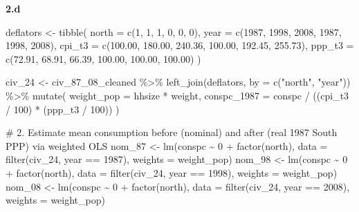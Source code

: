 \documentclass[
  letterpaper,
  DIV=11,
  numbers=noendperiod]{scrartcl}
\newenvironment{Shaded}{\begin{snugshade}}{\end{snugshade}}
\newcommand{\AttributeTok}[1]{\textcolor[rgb]{0.40,0.45,0.13}{#1}}
\newcommand{\CommentTok}[1]{\textcolor[rgb]{0.37,0.37,0.37}{#1}}
\newcommand{\DecValTok}[1]{\textcolor[rgb]{0.68,0.00,0.00}{#1}}
\newcommand{\FloatTok}[1]{\textcolor[rgb]{0.68,0.00,0.00}{#1}}
\newcommand{\FunctionTok}[1]{\textcolor[rgb]{0.28,0.35,0.67}{#1}}
\newcommand{\NormalTok}[1]{\textcolor[rgb]{0.00,0.23,0.31}{#1}}
\newcommand{\OtherTok}[1]{\textcolor[rgb]{0.00,0.23,0.31}{#1}}
\newcommand{\SpecialCharTok}[1]{\textcolor[rgb]{0.37,0.37,0.37}{#1}}
\newcommand{\StringTok}[1]{\textcolor[rgb]{0.13,0.47,0.30}{#1}}
\begin{document}
\textbf{2.d}

\begin{Shaded}
\begin{Highlighting}[]
\NormalTok{deflators }\OtherTok{\textless{}{-}} \FunctionTok{tibble}\NormalTok{(}
  \AttributeTok{north =} \FunctionTok{c}\NormalTok{(}\DecValTok{1}\NormalTok{, }\DecValTok{1}\NormalTok{, }\DecValTok{1}\NormalTok{, }\DecValTok{0}\NormalTok{, }\DecValTok{0}\NormalTok{, }\DecValTok{0}\NormalTok{),}
  \AttributeTok{year  =} \FunctionTok{c}\NormalTok{(}\DecValTok{1987}\NormalTok{, }\DecValTok{1998}\NormalTok{, }\DecValTok{2008}\NormalTok{, }\DecValTok{1987}\NormalTok{, }\DecValTok{1998}\NormalTok{, }\DecValTok{2008}\NormalTok{),}
  \AttributeTok{cpi\_t3 =} \FunctionTok{c}\NormalTok{(}\FloatTok{100.00}\NormalTok{, }\FloatTok{180.00}\NormalTok{, }\FloatTok{240.36}\NormalTok{, }\FloatTok{100.00}\NormalTok{, }\FloatTok{192.45}\NormalTok{, }\FloatTok{255.73}\NormalTok{),}
  \AttributeTok{ppp\_t3 =} \FunctionTok{c}\NormalTok{(}\FloatTok{72.91}\NormalTok{,  }\FloatTok{68.91}\NormalTok{,  }\FloatTok{66.39}\NormalTok{,  }\FloatTok{100.00}\NormalTok{, }\FloatTok{100.00}\NormalTok{, }\FloatTok{100.00}\NormalTok{)}
\NormalTok{)}

\NormalTok{civ\_24 }\OtherTok{\textless{}{-}}\NormalTok{ civ\_87\_08\_cleaned }\SpecialCharTok{\%\textgreater{}\%}
  \FunctionTok{left\_join}\NormalTok{(deflators, }\AttributeTok{by =} \FunctionTok{c}\NormalTok{(}\StringTok{"north"}\NormalTok{, }\StringTok{"year"}\NormalTok{)) }\SpecialCharTok{\%\textgreater{}\%}
  \FunctionTok{mutate}\NormalTok{(}
    \AttributeTok{weight\_pop  =}\NormalTok{ hhsize }\SpecialCharTok{*}\NormalTok{ weight,}
    \AttributeTok{conspc\_1987 =}\NormalTok{ conspc }\SpecialCharTok{/}\NormalTok{ ((cpi\_t3 }\SpecialCharTok{/} \DecValTok{100}\NormalTok{) }\SpecialCharTok{*}\NormalTok{ (ppp\_t3 }\SpecialCharTok{/} \DecValTok{100}\NormalTok{))}
\NormalTok{  )}

\CommentTok{\# 2. Estimate mean consumption before (nominal) and after (real 1987 South PPP) via weighted OLS}
\NormalTok{nom\_87  }\OtherTok{\textless{}{-}} \FunctionTok{lm}\NormalTok{(conspc }\SpecialCharTok{\textasciitilde{}} \DecValTok{0} \SpecialCharTok{+} \FunctionTok{factor}\NormalTok{(north), }\AttributeTok{data =} \FunctionTok{filter}\NormalTok{(civ\_24, year }\SpecialCharTok{==} \DecValTok{1987}\NormalTok{), }\AttributeTok{weights =}\NormalTok{ weight\_pop)}
\NormalTok{nom\_98  }\OtherTok{\textless{}{-}} \FunctionTok{lm}\NormalTok{(conspc }\SpecialCharTok{\textasciitilde{}} \DecValTok{0} \SpecialCharTok{+} \FunctionTok{factor}\NormalTok{(north), }\AttributeTok{data =} \FunctionTok{filter}\NormalTok{(civ\_24, year }\SpecialCharTok{==} \DecValTok{1998}\NormalTok{), }\AttributeTok{weights =}\NormalTok{ weight\_pop)}
\NormalTok{nom\_08  }\OtherTok{\textless{}{-}} \FunctionTok{lm}\NormalTok{(conspc }\SpecialCharTok{\textasciitilde{}} \DecValTok{0} \SpecialCharTok{+} \FunctionTok{factor}\NormalTok{(north), }\AttributeTok{data =} \FunctionTok{filter}\NormalTok{(civ\_24, year }\SpecialCharTok{==} \DecValTok{2008}\NormalTok{), }\AttributeTok{weights =}\NormalTok{ weight\_pop)}


\end{Highlighting}
\end{Shaded}
\end{document}
